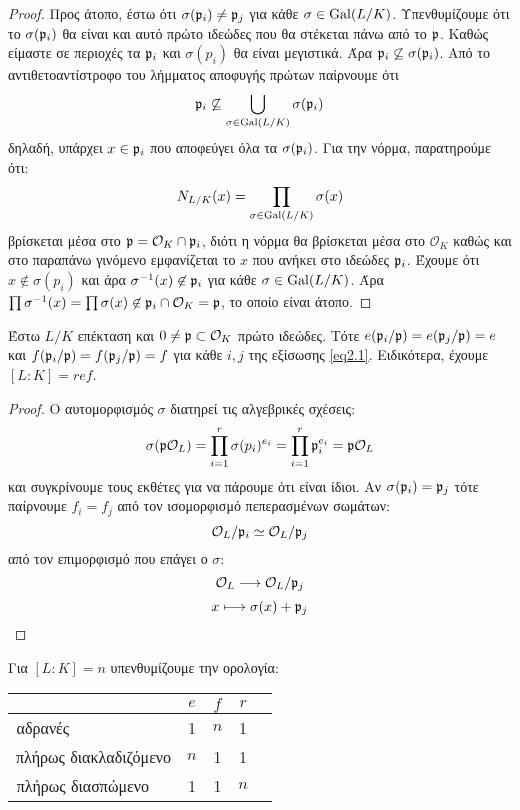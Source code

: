 \documentclass{report}
\begin{document}
\begin{proof} Προς άτοπο, έστω ότι $\sigma (\mathfrak{p}_i) \neq \mathfrak{p}_j$ για κάθε $\sigma \in \operatorname{Gal} (L/K)$. Υπενθυμίζουμε ότι το $\sigma (\mathfrak{p}_i)$ θα είναι και αυτό πρώτο ιδεώδες που θα στέκεται πάνω από το $\mathfrak{p}$. Καθώς είμαστε σε περιοχές  τα $\mathfrak{p}_i$ και $\sigma(p_i)$ θα είναι μεγιστικά. Άρα $\mathfrak{p}_i \not\subseteq \sigma(\mathfrak{p}_i)$. Από το αντιθετοαντίστροφο του λήμματος αποφυγής πρώτων παίρνουμε ότι 
	$$\mathfrak{p}_i \not\subseteq \bigcup\limits_{\sigma \in \operatorname{Gal} (L/K)} \sigma(\mathfrak{p}_i)$$ δηλαδή, υπάρχει $x \in \mathfrak{p}_i$ που αποφεύγει όλα τα $\sigma (\mathfrak{p}_i)$. Για την νόρμα, παρατηρούμε ότι:
	$$N_{L/K}(x) = \prod\limits_{\sigma \in \operatorname{Gal} (L/K)} \sigma(x)$$ βρίσκεται μέσα στο $\mathfrak{p} = \mathcal{O}_K \cap \mathfrak{p}_i$, διότι η νόρμα θα βρίσκεται μέσα στο $\mathcal{O}_K$ καθώς και στο παραπάνω γινόμενο εμφανίζεται το $x$ που ανήκει στο ιδεώδες $\mathfrak{p}_i$. Έχουμε ότι $x \not \in \sigma(p_i)$ και άρα $\sigma^{-1}(x) \not \in \mathfrak{p}_i$ για κάθε $\sigma \in \operatorname{Gal} (L/K)$. Άρα $\prod \sigma^{-1}(x) = \prod \sigma(x) \not \in \mathfrak{p}_i\cap \mathcal{O}_K = \mathfrak{p}$, το οποίο είναι άτοπο.
\end{proof}

\begin{cor}
	Έστω $L/K$  επέκταση και $0 \neq \mathfrak{p} \subset \mathcal{O}_K$ πρώτο ιδεώδες. Τότε $e(\mathfrak{p}_i/ \mathfrak{p}) = e(\mathfrak{p}_j/ \mathfrak{p}) = e$ και $f(\mathfrak{p}_i / \mathfrak{p}) = f(\mathfrak{p}_j /\mathfrak{p})=f$ για κάθε $i,j$ της εξίσωσης \ref{eq2.1}. Ειδικότερα, έχουμε $[L:K] = ref$.
\end{cor}
\begin{proof}
	Ο αυτομορφισμός $\sigma$ διατηρεί τις αλγεβρικές σχέσεις:
	$$\sigma (\mathfrak{p} \mathcal{O}_L) = \prod\limits_{i=1}^r \sigma(p_i)^{e_i} = \prod\limits_{i=1}^r \mathfrak{p}_i^{e_i} = \mathfrak{p} \mathcal{O}_L$$ και συγκρίνουμε τους εκθέτες για να πάρουμε ότι είναι ίδιοι. Αν $\sigma(\mathfrak{p}_i) = \mathfrak{p}_j$ τότε παίρνουμε $f_i = f_j$ από τον ισομορφισμό πεπερασμένων σωμάτων:
	$$\mathcal{O}_L / \mathfrak{p}_i \simeq \mathcal{O}_L / \mathfrak{p}_j$$ από τον επιμορφισμό που επάγει ο $\sigma$:
	$$\mathcal{O}_L \longrightarrow \mathcal{O}_L / \mathfrak{p}_j $$
	$$x \longmapsto \sigma(x) + \mathfrak{p}_j$$
\end{proof}


Για $[L:K]=n$ υπενθυμίζουμε την ορολογία:
\begin{center}
\begin{tabular}{ |c|c|c|c|c| } 
	\hline
	 & $e$ & $f$ & $r$ \\
	\hline
	 αδρανές $\quad \quad \quad \quad \quad \quad$ & 1 & $n$ & 1\\ 
	 πλήρως διακλαδιζόμενο & $n$ & 1 & 1 \\ 
	 πλήρως διασπώμενο $\quad $& 1 & 1 & $n$ \\ 
	 \hline
	 \end{tabular}
	\end{center}
\end{document}
